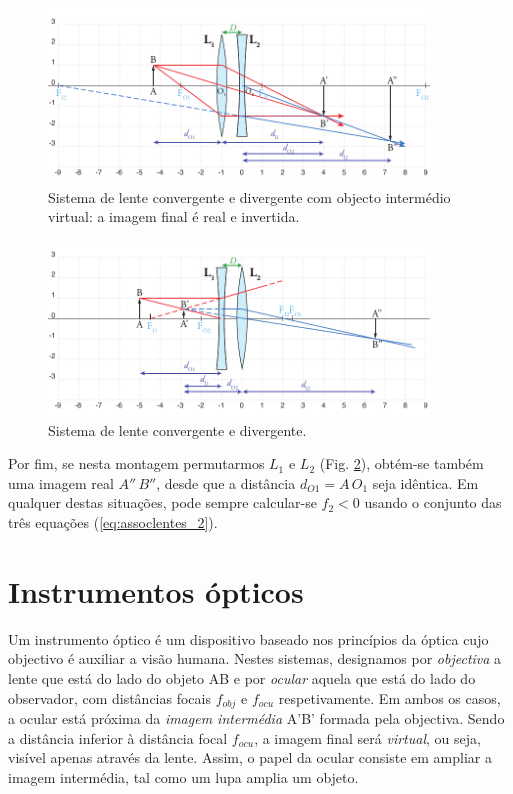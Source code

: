 \documentclass[a4paper,twoside,11pt]{report}      %
\begin{document}
\begin{figure}	[b] 
\begin{center}
	\includegraphics[width=0.9\textwidth]{12-DuplaConvDiv2}
	\caption{Sistema de lente convergente e divergente com objecto intermédio virtual: a imagem final é real e invertida. \label{fig:DuplaConvDiv2}} 
\end{center}
\end{figure}

\begin{figure}	[!htb]  
\begin{center}
	\includegraphics[width=0.9\textwidth]{13-DuplaConvDiv3}
\end{center}
	\caption{Sistema de lente convergente e divergente.  \label{fig:DuplaConvDiv3}} 
\end{figure}


Por fim, se nesta montagem permutarmos $L_1$ e $L_2$ (Fig. \ref{fig:DuplaConvDiv3}), obtém-se também uma imagem real  $A''\,B''$, desde que a distância $d_{O1}=A\,O_1$ seja idêntica.
Em qualquer destas situações, pode sempre calcular-se $f_2 < 0$ usando o conjunto das três equações (\ref{eq:assoclentes_2}).
\clearpage



\section{\sf Instrumentos ópticos}
Um instrumento óptico é um dispositivo baseado nos princípios da óptica cujo objectivo é auxiliar a visão humana. Nestes sistemas, designamos por \emph{objectiva} a lente que está do lado do objeto AB e por \emph{ocular} aquela que está do lado do observador, com distâncias focais $f_{obj}$ e $f_{ocu}$ respetivamente. Em ambos os casos, a ocular está  próxima da \emph{imagem intermédia} A'B' formada pela objectiva. Sendo a distância inferior à distância focal $f_{ocu}$, a imagem final será \emph{virtual}, ou seja, visível apenas através da lente.
Assim, o papel da ocular consiste em ampliar a imagem intermédia, tal como um lupa amplia um objeto.
\end{document}
